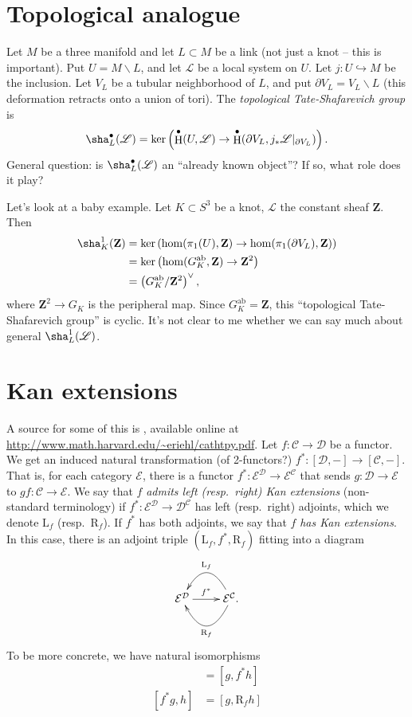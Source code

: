 \documentclass{amsart}
\DeclareMathOperator{\h}{H}
\newcommand{\cC}{\mathcal{C}}
\newcommand{\cD}{\mathcal{D}}
\newcommand{\cE}{\mathcal{E}}
\newcommand{\dZ}{\mathbf{Z}}
\newcommand{\sL}{\mathscr{L}}
\newcommand{\abelian}{\mathrm{ab}}
\newcommand{\lan}{\mathrm{L}}
\newcommand{\ran}{\mathrm{R}}
\begin{document}
\section{Topological analogue}

Let $M$ be a three manifold and let $L\subset M$ be a link (not just a knot -- 
this is important). Put $U=M\smallsetminus L$, and let $\sL$ be a local system 
on $U$. Let $j:U\hookrightarrow M$ be the inclusion. Let $V_L$ be a tubular 
neighborhood of $L$, and put $\partial V_L=V_L\smallsetminus L$ (this 
deformation retracts onto a union of tori). The \emph{topological 
Tate-Shafarevich group} is 
\[
  \sha_L^\bullet(\sL) = \ker\left(\h^\bullet(U,\sL) \to \h^\bullet(\partial V_L,j_\ast \sL|_{\partial V_L})\right) .
\]
General question: is $\sha_L^\bullet(\sL)$ an ``already known object''? If so, 
what role does it play?

Let's look at a baby example. Let $K\subset S^3$ be a knot, $\sL$ the constant 
sheaf $\dZ$. Then 
\begin{align*}
  \sha_K^1(\dZ) 
    &= \ker\left(\hom(\pi_1(U),\dZ) \to \hom(\pi_1(\partial V_L),\dZ)\right) \\
    &= \ker\left(\hom(G_K^\abelian,\dZ) \to \dZ^2\right) \\
    &= \left(G_K^\abelian / \dZ^2\right)^\vee ,
\end{align*}
where $\dZ^2\to G_K$ is the peripheral map. Since $G_K^\abelian=\dZ$, this 
``topological Tate-Shafarevich group'' is cyclic. It's not clear to me whether 
we can say much about general $\sha_L^1(\sL)$. 





\section{Kan extensions}

A source for some of this is \cite{riehl-2014}, available online at 
\url{http://www.math.harvard.edu/~eriehl/cathtpy.pdf}. Let $f:\cC\to \cD$ be a 
functor. We get an induced natural transformation (of 2-functors?) 
$f^\ast:[\cD,-] \to [\cC,-]$. That is, for each category $\cE$, there is a 
functor $f^\ast:\cE^\cD\to \cE^\cC$ that sends $g:\cD\to \cE$ to 
$g f:\cC\to \cE$. We say that $f$ \emph{admits left (resp.~right) Kan 
extensions} (non-standard terminology) if $f^\ast:\cE^\cD\to \cD^\cC$ has 
left (resp.~right) adjoints, which we denote $\lan_f$ (resp.~$\ran_f$). If 
$f^\ast$ has both adjoints, we say that $f$ \emph{has Kan extensions}. In 
this case, there is an adjoint triple $(\lan_f,f^\ast,\ran_f)$ fitting into a 
diagram 
\[\xymatrix{
  \cE^\cD \ar[r]^-{f^\ast} 
    & \cE^\cC .\ar@/^2pc/[l]^{\ran_f} \ar@/_2pc/[l]_{\lan_f}
}\]
To be more concrete, we have natural isomorphisms 
\begin{align*}
  [\lan_f g,h] &= [g,f^\ast h] \\
  [f^\ast g,h] &= [g,\ran_f h] 
\end{align*}
\end{document}
